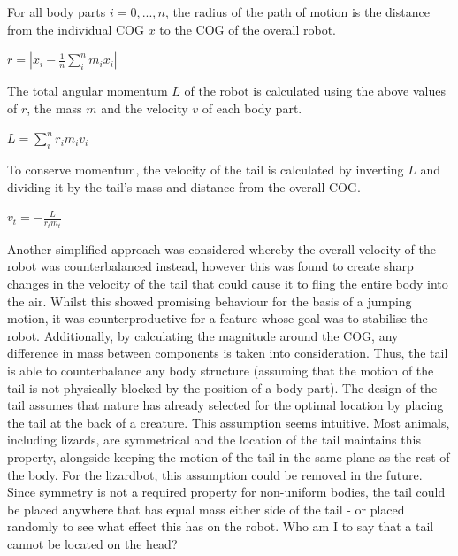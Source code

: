\documentclass{article}
\begin{document}
For all body parts $i = 0, ..., n$, the radius of the path of motion is the distance from the individual COG $x$ to the COG of the overall robot.
\begin{center}
\begin{Large}
$r = |x_{i} - \frac{1}{n}\sum_{i}^{n}m_{i}x_{i}|$
\end{Large}
\end{center}
The total angular momentum $L$ of the robot is calculated using the above values of $r$, the mass $m$ and the velocity $v$ of each body part. 
\begin{center}
\begin{Large}
$L = \sum^{n}_{i} r_{i}m_{i}v_{i}$
\end{Large}
\end{center}
To conserve momentum, the velocity of the tail is calculated by inverting $L$ and dividing it by the tail's mass and distance from the overall COG.
\begin{center}
\begin{Large}
$v_{t} = - \frac{L}{r_{t}m_{t}}$\\
\end{Large}
\end{center}

Another simplified approach was considered whereby the overall velocity of the robot was counterbalanced instead, however this was found to create sharp changes in the velocity of the tail that could cause it to fling the entire body into the air. Whilst this showed promising behaviour for the basis of a jumping motion, it was counterproductive for a feature whose goal was to stabilise the robot. Additionally, by calculating the magnitude around the COG, any difference in mass between components is taken into consideration. Thus, the tail is able to counterbalance any body structure (assuming that the motion of the tail is not physically blocked by the position of a body part).
The design of the tail assumes that nature has already selected for the optimal location by placing the tail at the back of a creature. This assumption seems intuitive. Most animals, including lizards, are symmetrical and the location of the tail maintains this property, alongside keeping the motion of the tail in the same plane as the rest of the body. For the lizardbot, this assumption could be removed in the future. Since symmetry is not a required property for non-uniform bodies, the tail could be placed anywhere that has equal mass either side of the tail - or placed randomly to see what effect this has on the robot. Who am I to say that a tail cannot be located on the head?
\end{document}
